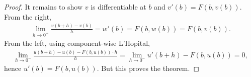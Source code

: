 \begin{proof}
    It remains to show $v$ is differentiable at $b$ and $v'(b) = F(b,v(b))$. From the right,
    \begin{align*}
        \lim_{h \to 0^{+}} \frac{v(b+h) - v(b)}{h} = w'(b) = F(b,w(b)) = F(b, v(b)). 
    \end{align*}
    From the left, using component-wise L'Hopital,
    \begin{align*}
        \lim_{h \to 0^{-}} \frac{u(b+h) - u(b) - F(b, u(b)) \cdot h}{h} = \lim_{h \to 0^{-}} u'(b+h) - F(b, u(b)) = 0,
    \end{align*}
    hence $u'(b) = F(b,u(b))$. But this proves the theorem.
\end{proof}
